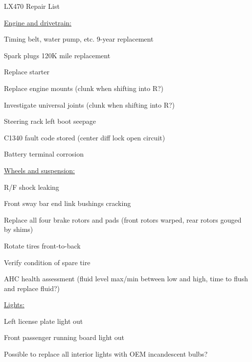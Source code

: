 \documentclass[12pt]{article}
\begin{document}
{\large LX470 Repair List}

\vspace{0.25in}


\underline{\large Engine and drivetrain:}

\begin{todolist}
\item Timing belt, water pump, etc. 9-year replacement
\item Spark plugs 120K mile replacement
\item Replace starter
\item Replace engine mounts (clunk when shifting into R?)
\item Investigate universal joints (clunk when shifting into R?)
\item Steering rack left boot seepage
\item C1340 fault code stored (center diff lock open circuit)
\item Battery terminal corrosion
\end{todolist}



\vspace{0.25in}

\underline{\large Wheels and suspension:}

\begin{todolist}
\item R/F shock leaking
\item Front sway bar end link bushings cracking
\item Replace all four brake rotors and pads (front rotors warped, rear rotors gouged by shims)
\item Rotate tires front-to-back
\item Verify condition of spare tire
\item AHC health assessment (fluid level max/min between low and high, time to flush and replace fluid?)
\end{todolist}




\vspace{0.25in}

\underline{\large Lights:}

\begin{todolist}
\item Left license plate light out
\item Front passenger running board light out
\item Possible to replace all interior lights with OEM incandescent bulbs? 
\end{todolist}
\end{document}
